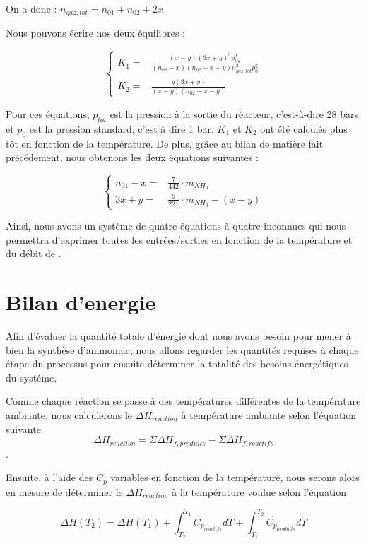 On a donc : $n_{gaz,tot} = n_{01} + n_{02} + 2x$ 
  
Nous pouvons écrire nos deux équilibres : 
 
$$
	\left\{
		\begin{array}{rl}
			K_1 =& \frac{(x-y)(3x+y)^3p_{tot}^2}{(n_{02}-x)(n_{02}-x-y)n_{gaz,tot}^2p_0^2} \\
			K_2 =& \frac{y(3x+y)}{(x-y)(n_{02}-x-y)}
		\end{array}
	\right.
$$

Pour ces équations, $p_{tot}$ est la pression à la sortie du réacteur, c'est-à-dire 28 bars
et $p_0$ est la pression standard, c'est à dire 1 bar.
$K_1$ et $K_2$ ont été calculés plus tôt en fonction de la température. 
De plus, grâce au bilan de matière fait précédement, nous obtenons les deux équations suivantes :

$$
	\left\{
		\begin{array}{rl}
			n_{01} - x =& \frac{7}{442} \cdot m_{NH_3} \\
			3x + y		 =& \frac{9}{221} \cdot m_{NH_3} - (x-y)
		\end{array}
	\right.
$$
 
Ainsi, nous avons un système de quatre équations à quatre inconnues qui nous permettra d'exprimer
toutes les entrées/sorties en fonction de la température et du débit de . 
   
\section{Bilan d'energie}
Afin d'évaluer la quantité totale d'énergie dont nous avons besoin pour mener à 
bien la synthèse d'ammoniac, nous allons regarder les quantités requises à chaque 
étape du processus pour ensuite déterminer la totalité des besoins énergétiques du
systéme.

Comme chaque réaction se passe à des températures différentes de la température ambiante,
nous calculerons le $\Delta H_{reaction}$ à température ambiante selon l'équation suivante 
$$\Delta H_{reaction} = \Sigma \Delta H_{f,produits} - \Sigma \Delta H_{f,reactifs}$$.

Ensuite, à l'aide des $C_{p}$ variables en fonction de la température, nous serons alors en 
mesure de déterminer le $\Delta H_{reaction}$ à la température voulue selon l'équation

$$\Delta H(T_2) = \Delta H(T_{1}) 
+ \int_{T_2}^{T_1} C_{p_{reactifs}} dT + \int_{T_1}^{T_2} C_{p_{produits}} dT$$ 

